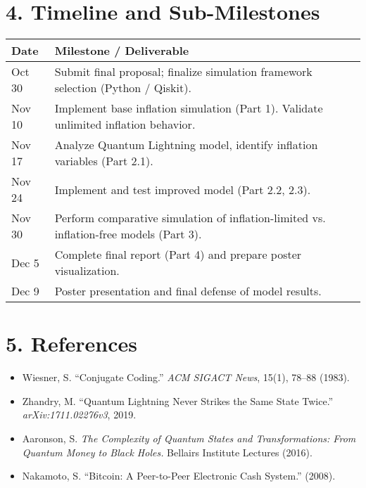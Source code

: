 \documentclass[a4paper,10.5pt,twoside]{article}
\begin{document}
\section*{4. Timeline and Sub-Milestones}

\begin{tabular}{|p{25mm}|p{90mm}|}
\hline
\textbf{Date} & \textbf{Milestone / Deliverable} \\
\hline
Oct 30 & Submit final proposal; finalize simulation framework selection (Python / Qiskit). \\
Nov 10 & Implement base inflation simulation (Part 1). Validate unlimited inflation behavior. \\
Nov 17 & Analyze Quantum Lightning model, identify inflation variables (Part 2.1). \\
Nov 24 & Implement and test improved model (Part 2.2, 2.3). \\
Nov 30 & Perform comparative simulation of inflation-limited vs. inflation-free models (Part 3). \\
Dec 5 & Complete final report (Part 4) and prepare poster visualization. \\
Dec 9 & Poster presentation and final defense of model results. \\
\hline
\end{tabular}

\section*{5. References}
\begin{itemize}
    \item Wiesner, S. “Conjugate Coding.” \textit{ACM SIGACT News}, 15(1), 78–88 (1983).
    \item Zhandry, M. “Quantum Lightning Never Strikes the Same State Twice.” \textit{arXiv:1711.02276v3}, 2019.
    \item Aaronson, S. \textit{The Complexity of Quantum States and Transformations: From Quantum Money to Black Holes.} Bellairs Institute Lectures (2016).
    \item Nakamoto, S. “Bitcoin: A Peer-to-Peer Electronic Cash System.” (2008).
\end{itemize}
\end{document}
